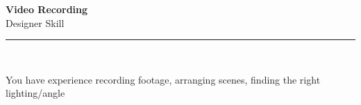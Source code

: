 \documentclass[11pt,a4paper]{memoir}
\begin{document}
    \begin{Spacing}{0.75}%
        \noindent
        \Large
        \textbf{Video Recording}\\[3pt]
        \scriptsize\color{gray}Designer Skill\\ 
        \rule{\textwidth}{.3mm}\\
        
        \vspace{3mm}
        \noindent
        \begin{minipage}[t]{53mm}
            \begin{flushleft}
            {
                \normalsize
                \begin{Spacing}{1}%
                \color{black}\textrm{You have experience recording footage, arranging scenes, finding the right lighting/angle}\\
                \end{Spacing}
            }
            \end{flushleft}
        \end{minipage}

        \vspace{5mm}
        \noindent
        \begin{minipage}[t]{53mm}
            \begin{flushleft}
            {
                \normalsize
                \begin{Spacing}{1}%
                \color{gray}\textit{}\\
                \end{Spacing}
            }
            \end{flushleft}
        \end{minipage}
    \end{Spacing}
    \clearpage
\end{document}
